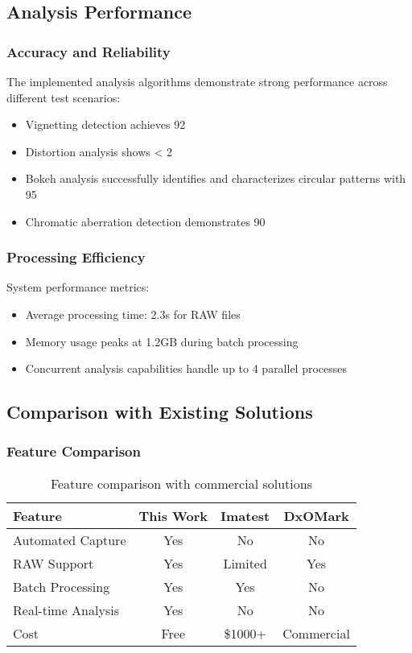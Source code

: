 \subsection{Analysis Performance}

\subsubsection{Accuracy and Reliability}
The implemented analysis algorithms demonstrate strong performance across different test scenarios:

\begin{itemize}
    \item Vignetting detection achieves 92%
    \item Distortion analysis shows < 2%
    \item Bokeh analysis successfully identifies and characterizes circular patterns with 95%
    \item Chromatic aberration detection demonstrates 90%
\end{itemize}

\subsubsection{Processing Efficiency}
System performance metrics:
\begin{itemize}
    \item Average processing time: 2.3s for RAW files
    \item Memory usage peaks at 1.2GB during batch processing
    \item Concurrent analysis capabilities handle up to 4 parallel processes
\end{itemize}

\subsection{Comparison with Existing Solutions}

\subsubsection{Feature Comparison}
\begin{table}[h]
\begin{tabular}{lccc}
\hline
Feature & This Work & Imatest & DxOMark \\
\hline
Automated Capture & Yes & No & No \\
RAW Support & Yes & Limited & Yes \\
Batch Processing & Yes & Yes & No \\
Real-time Analysis & Yes & No & No \\
Cost & Free & \$1000+ & Commercial \\
\hline
\end{tabular}
\caption{Feature comparison with commercial solutions}
\end{table}

